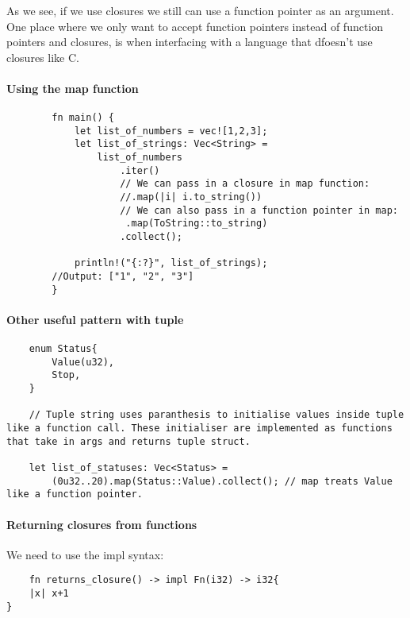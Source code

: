 As we see, if we use closures we still can use a function pointer as an argument. One place where we only want to accept function pointers instead of function pointers and closures, is when interfacing with a language that dfoesn't use closures like C. 
\newpage
\begin{example}
    \item \paragraph*{Using the map function}\begin{lstlisting}
        fn main() {
            let list_of_numbers = vec![1,2,3];
            let list_of_strings: Vec<String> = 
                list_of_numbers
                    .iter()
                    // We can pass in a closure in map function:
                    //.map(|i| i.to_string())
                    // We can also pass in a function pointer in map:
                     .map(ToString::to_string)
                    .collect();
        
            println!("{:?}", list_of_strings);
        //Output: ["1", "2", "3"]
        }
\end{lstlisting}
\item \paragraph*{Other useful pattern with tuple}\begin{lstlisting}
    enum Status{
        Value(u32),
        Stop,
    }

    // Tuple string uses paranthesis to initialise values inside tuple like a function call. These initialiser are implemented as functions that take in args and returns tuple struct. 

    let list_of_statuses: Vec<Status> = 
        (0u32..20).map(Status::Value).collect(); // map treats Value like a function pointer.
\end{lstlisting}
\end{example}
\paragraph*{Returning closures from functions}

We need to use the impl syntax:\begin{lstlisting}
    fn returns_closure() -> impl Fn(i32) -> i32{
    |x| x+1
}
\end{lstlisting}

